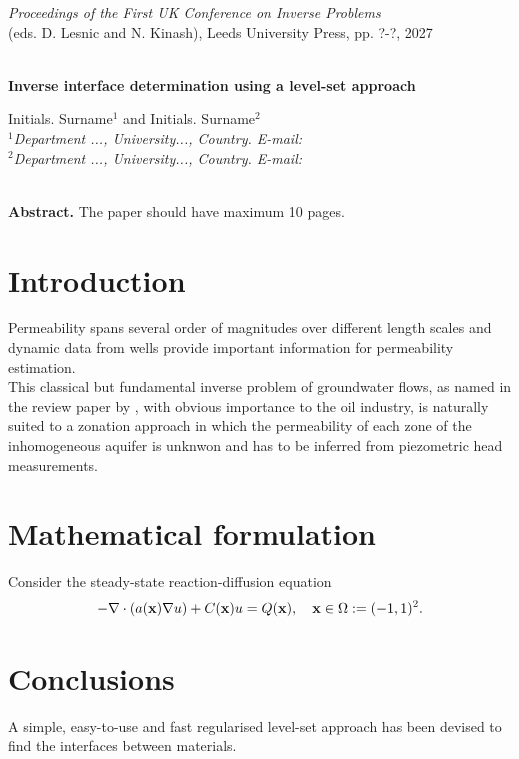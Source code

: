 \documentclass[12pt]{article}
\begin{document}
\noindent
{\it Proceedings of the First UK Conference on Inverse Problems}\\
(eds. D. Lesnic and N. Kinash), Leeds University Press, pp. ?-?, 2027\\

\noindent
\\

\begin{center}
\Large{\bf Inverse interface determination using a level-set approach}
\end{center}

\begin{center}
Initials. Surname$^{1}$ and Initials. Surname$^{2}$\\
$^{1}${\it Department ..., University..., Country. E-mail: }\\
$^{2}${\it Department ..., University..., Country. E-mail: }\\
\end{center}

\noindent
\\

\noindent
{\bf Abstract.} The paper should have maximum 10 pages.

\section{Introduction} \label{Section1}
Permeability spans several order of magnitudes over different length scales and 
dynamic data from wells provide important information for permeability 
estimation.\\
\indent
This classical but fundamental inverse problem of groundwater flows, as named in the review paper by \cite{Yeh}, with obvious importance to the oil industry, is naturally suited 
to a zonation approach in which the permeability of each zone of the inhomogeneous aquifer is unknwon 
and has to be inferred from piezometric head 
measurements. 

\section{Mathematical formulation} \label{Section2}
Consider the steady-state reaction-diffusion equation
\begin{eqnarray}
- \nabla \cdot (a({\bf x}) \nabla u) + C({\bf x}) u=Q({\bf x}), \quad {\bf x} \in \Omega:=(-1,1)^{2}. 
\label{eq:1}
\end{eqnarray}

\section{Conclusions} \label{Section5}
A simple, easy-to-use and fast regularised level-set approach has been devised to 
find the interfaces between materials.  \\
\end{document}
